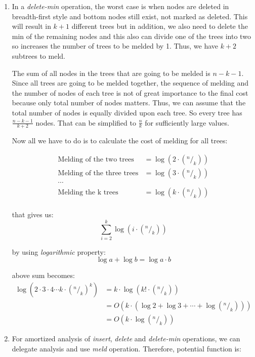 \begin{enumerate}
  \item 
  In a \textit{delete-min} operation, the worst case is when nodes are deleted in breadth-first style and bottom nodes still exist, not marked as deleted. This will result in $k+1$ different trees but in addition, we also need to delete the min of the remaining nodes and this also can divide one of the trees into two so increases the number of trees to be melded by 1. Thus, we have $k + 2$ subtrees to meld.

  The sum of all nodes in the trees that are going to be melded is $n-k-1$. Since all trees are going to be melded together, the sequence of melding and the number of nodes of each tree is not of great importance to the final cost because only total number of nodes matters. Thus, we can assume that the total number of nodes is equally divided upon each tree. So every tree has $\frac{n - k - 1}{k + 2}$ nodes. That can be simplified to $\frac{n}{k}$ for sufficiently large values.

  Now all we have to do is to calculate the cost of melding for all trees:
  
  \begin{align*}
    \text{Melding of the two trees}   &= \log(2 \cdot (^n/_k)) \\
    \text{Melding of the three trees} &= \log(3 \cdot (^n/_k)) \\
    \cdots  \\
    \text{Melding the k trees}        &= \log(k \cdot (^n/_k)) \\
  \end{align*}

 that gives us:
 $$
  \sum_{i=2}^{k}{\log(i \cdot (^n/_k))} 
 $$

 by using \textit{logarithmic} property: 
 $$
  \log a + \log b = \log a \cdot b 
 $$
 
 above sum becomes: 
 \begin{align*}
   \log(2 \cdot 3 \cdot 4 \cdots k \cdot (^n/_k)^{k}) &= k \cdot \log (k! \cdot (^n/_k)) \\
   &= O(k \cdot (\log 2 + \log 3 + \cdots + \log (^n/_k))) \\
   &= O(k \cdot \log(^n/_k))
 \end{align*}

 \item
 For amortized analysis of \textit{insert}, \textit{delete} and \textit{delete-min} operations, we can delegate analysis and use \textit{meld} operation. Therefore, potential function is:
 

\end{enumerate}
